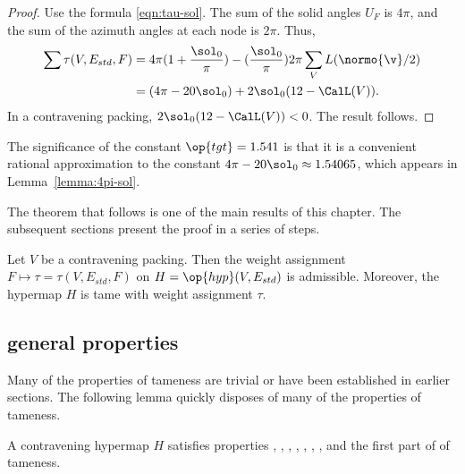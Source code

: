 \begin{proof}
Use the formula \eqref{eqn:tau-sol}.
  The sum of the solid angles $U_F$ is $4\pi$, and the sum of the azimuth
  angles at each node is $2\pi$.
Thus,
\begin{align}\label{eqn:delta0}
  \sum \tau (V,E_{std},F) 
  &= 4\pi (1 + \dfrac{\sol_0}{\pi}) 
- (\dfrac{\sol_0}{\pi}) 2\pi \sum_{V} L(\normo{\v}/2)\vspace{6pt}\\
&= (4\pi - 20\sol_0) + 2\sol_0 (12 - \CalL(V)).
\end{align}
In a contravening packing, $2\sol_0(12-\CalL(V))<0$.
The result follows.
\end{proof}

\begin{remark}\label{rem:tgt}
The significance of the constant $\op{tgt}=1.541$ is that it is a
convenient rational approximation to the constant $4\pi -
20\sol_0\approx 1.54065$, which appears in Lemma~\ref{lemma:4pi-sol}.
%
\end{remark}

The theorem that follows is one of the main results of this chapter.  The subsequent
sections present the proof in a series of steps.

\begin{theorem} \label{theorem:contravene}
  Let $V$ be a contravening packing.  Then the weight assignment
  $F\mapsto\tau=\tau(V,E_{std},F)$ on $H=\op{hyp}(V,E_{std})$ is
  admissible.  Moreover, the hypermap $H$ is tame with weight
  assignment $\tau$.
\end{theorem}
%
%
%



\subsection{general properties}
\label{sec:startame}


Many of the properties of tameness are trivial or have been
established in earlier sections.  The following lemma quickly disposes
of many of the properties of tameness.

\begin{lemma}[]\label{lemma:multi}
  A contravening hypermap $H$ satisfies properties ,
  , , , , , , and the first
  part of 
of tameness.
\end{lemma}

